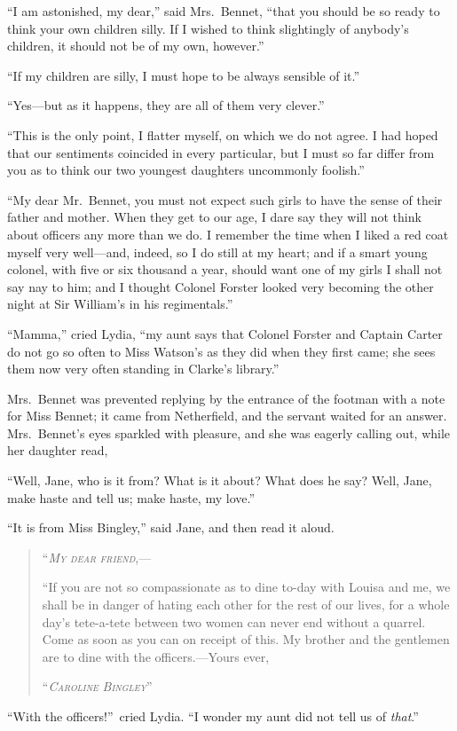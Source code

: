 \documentclass[12pt,english]{book}
\newcommand{\noun}[1]{\textsc{#1}}
\begin{document}
{}``I am astonished, my dear,'' said Mrs.\ Bennet, {}``that you
should be so ready to think your own children silly. If I wished to
think slightingly of anybody's children, it should not be of my own,
however.''

{}``If my children are silly, I must hope to be always sensible of
it.''

{}``Yes\mbox{---}but as it happens, they are all of them very clever.''

{}``This is the only point, I flatter myself, on which we do not
agree. I had hoped that our sentiments coincided in every particular,
but I must so far differ from you as to think our two youngest daughters
uncommonly foolish.''

{}``My dear Mr.\ Bennet, you must not expect such girls to have
the sense of their father and mother. When they get to our age, I
dare say they will not think about officers any more than we do. I
remember the time when I liked a red coat myself very well\mbox{---}and,
indeed, so I do still at my heart; and if a smart young colonel, with
five or six thousand a year, should want one of my girls I shall not
say nay to him; and I thought Colonel Forster looked very becoming
the other night at Sir William's in his regimentals.''

{}``Mamma,'' cried Lydia, {}``my aunt says that Colonel Forster
and Captain Carter do not go so often to Miss Watson's as they did
when they first came; she sees them now very often standing in Clarke's
library.''

Mrs.\ Bennet was prevented replying by the entrance of the footman
with a note for Miss Bennet; it came from Netherfield, and the servant
waited for an answer. Mrs.\ Bennet's eyes sparkled with pleasure,
and she was eagerly calling out, while her daughter read,

{}``Well, Jane, who is it from? What is it about? What does he say?
Well, Jane, make haste and tell us; make haste, my love.''

{}``It is from Miss Bingley,'' said Jane, and then read it aloud.

\begin{quotation}
\noindent {}``\textit{\emph{\noun{My}}} \textit{\emph{\noun{dear}}}
\textit{\emph{\noun{friend}}},\mbox{---}

{}``If you are not so compassionate as to dine to-day with Louisa
and me, we shall be in danger of hating each other for the rest of
our lives, for a whole day's tete-a-tete between two women can never
end without a quarrel. Come as soon as you can on receipt of this.
My brother and the gentlemen are to dine with the officers.\mbox{---}Yours
ever,

``\textit{\emph{\noun{Caroline}}} \textit{\emph{\noun{Bingley}}}'' 
\end{quotation}
{}``With the officers!''\ cried Lydia. {}``I wonder my aunt did
not tell us of \textit{that}.''
\end{document}
